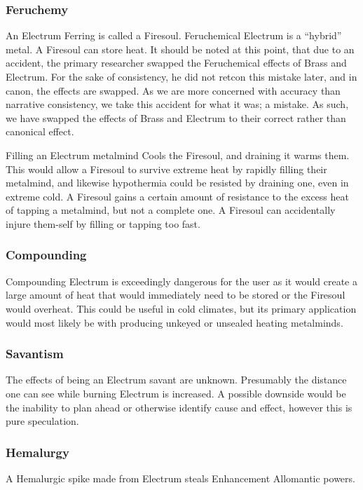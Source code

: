 \documentclass[conference]{IEEEtran}
\begin{document}
\subsubsection*{\textbf{Feruchemy}}
An Electrum Ferring is called a Firesoul.\cite{ARS}  Feruchemical Electrum is a ``hybrid'' metal.\cite{FE-TB}  A Firesoul can store heat.\cite{ARS}  It should be noted at this point, that due to an accident, the primary researcher swapped the Feruchemical effects of Brass and Electrum.   For the sake of consistency, he did not retcon this mistake later, and in canon, the effects are swapped.  As we are more concerned with accuracy than narrative consistency, we take this accident for what it was; a mistake.\cite{mistake}\cite{unreliability}  As such, we have swapped the effects of Brass and Electrum to their correct rather than canonical effect.  

Filling an Electrum metalmind Cools the Firesoul, and draining it warms them.  This would allow a Firesoul to survive extreme heat by rapidly filling their metalmind,\cite{fire-res} and likewise hypothermia could be resisted by draining one, even in extreme cold.\cite{BoM-CH24}  A Firesoul gains a certain amount of resistance to the excess heat of tapping a metalmind, but not a complete one.\cite{fire-res}  A Firesoul can accidentally injure them-self by filling or tapping too fast.\cite{fire-pound}\\
\subsubsection*{\textbf{Compounding}}
Compounding Electrum is exceedingly dangerous for the user as it would create a large amount of heat that would immediately need to be stored or the Firesoul would overheat.\cite{fire-pound}  This could be useful in cold climates, but its primary application would most likely be with producing unkeyed or unsealed heating metalminds.\\
\subsubsection*{\textbf{Savantism}}
The effects of being an Electrum savant are unknown.  Presumably the distance one can see while burning Electrum is increased.  A possible downside would be the inability to plan ahead or otherwise identify cause and effect, however this is pure speculation.\\
\subsubsection*{\textbf{Hemalurgy}}
A Hemalurgic spike made from Electrum steals Enhancement Allomantic powers.\cite{HE-TB}\\
\end{document}
